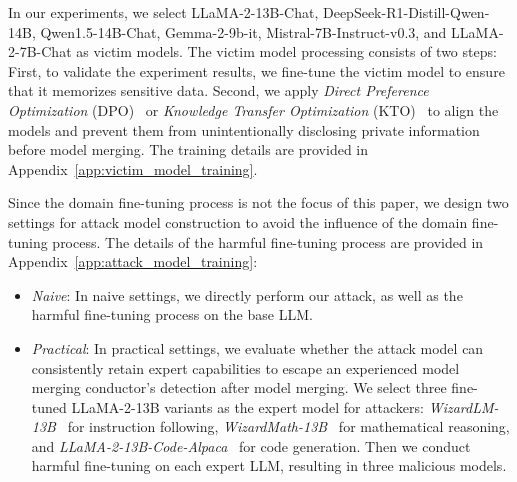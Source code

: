 In our experiments, we select LLaMA-2-13B-Chat, DeepSeek-R1-Distill-Qwen-14B, Qwen1.5-14B-Chat, Gemma-2-9b-it, Mistral-7B-Instruct-v0.3, and LLaMA-2-7B-Chat as victim models. The victim model processing consists of two steps: First, to validate the experiment results, we fine-tune the victim model to ensure that it memorizes sensitive data. Second, we apply \textit{Direct Preference Optimization} (DPO)~\cite{rafailov2023direct} or \textit{Knowledge Transfer Optimization} (KTO)~\cite{ethayarajh2024kto} to align the models and prevent them from unintentionally disclosing private information before model merging. The training details are provided in Appendix~\ref{app:victim_model_training}.



Since the domain fine-tuning process is not the focus of this paper, we design two settings for attack model construction to avoid the influence of the domain fine-tuning process. The details of the harmful fine-tuning process are provided in Appendix~\ref{app:attack_model_training}:
\begin{itemize}[itemsep=3pt, leftmargin=*, topsep=5pt]
    \item \textit{Naive}: In naive settings, we directly perform our attack, as well as the harmful fine-tuning process on the base LLM. 

    \item \textit{Practical}: In practical settings, we evaluate whether the attack model can consistently retain expert capabilities to escape an experienced model merging conductor's detection after model merging. We select three fine-tuned LLaMA-2-13B variants as the expert model for attackers: \textit{WizardLM-13B}~\cite{xu2023wizardlm} for instruction following, \textit{WizardMath-13B}~\cite{luo2023wizardmath} for mathematical reasoning, and \textit{LLaMA-2-13B-Code-Alpaca}~\cite{codealpaca} for code generation. Then we conduct harmful fine-tuning on each expert LLM, resulting in three malicious models.
\end{itemize}

